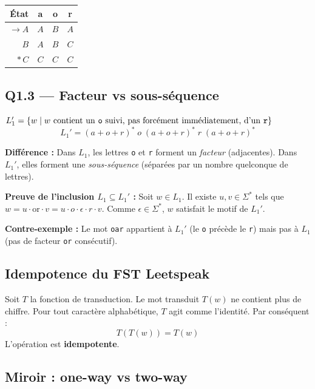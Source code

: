 \documentclass[12pt,a4paper,oneside]{scrartcl}
\begin{document}
\begin{center}
\begin{tabular}{r ccc}
    \toprule
    \textbf{État} & \textbf{a} & \textbf{o} & \textbf{r} \\
    \midrule
    $\to A$ & $A$ & $B$ & $A$ \\
    $B$ & $A$ & $B$ & $C$ \\
    $*\, C$ & $C$ & $C$ & $C$ \\
    \bottomrule
\end{tabular}
\end{center}

\subsection{Q1.3 — Facteur vs sous-séquence}

\begin{definitionbox}
$L_1' = \{w \mid w \text{ contient un \texttt{o} suivi, pas forcément immédiatement, d'un \texttt{r}}\}$
$$\boxed{L_1' = (a+o+r)^*\;o\;(a+o+r)^*\;r\;(a+o+r)^*}$$
\end{definitionbox}

\textbf{Différence :} Dans $L_1$, les lettres \texttt{o} et \texttt{r} forment un \textit{facteur} (adjacentes). Dans $L_1'$, elles forment une \textit{sous-séquence} (séparées par un nombre quelconque de lettres).

\textbf{Preuve de l'inclusion $L_1 \subseteq L_1'$ :} Soit $w \in L_1$. Il existe $u, v \in \Sigma^*$ tels que $w = u \cdot \text{or} \cdot v = u \cdot o \cdot \epsilon \cdot r \cdot v$. Comme $\epsilon \in \Sigma^*$, $w$ satisfait le motif de $L_1'$.

\textbf{Contre-exemple :} Le mot \texttt{oar} appartient à $L_1'$ (le \texttt{o} précède le \texttt{r}) mais pas à $L_1$ (pas de facteur \texttt{or} consécutif).

\subsection{Idempotence du FST Leetspeak}

Soit $T$ la fonction de transduction. Le mot transduit $T(w)$ ne contient plus de chiffre. Pour tout caractère alphabétique, $T$ agit comme l'identité. Par conséquent :
$$T(T(w)) = T(w)$$
L'opération est \textbf{idempotente}.

\subsection{Miroir : one-way vs two-way}
\end{document}
